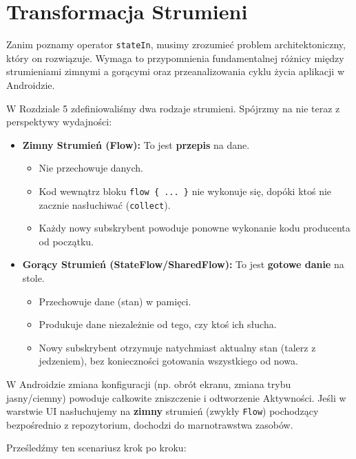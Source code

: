 \section{Transformacja Strumieni}

Zanim poznamy operator \texttt{stateIn}, musimy zrozumieć problem architektoniczny, który on rozwiązuje. Wymaga to przypomnienia fundamentalnej różnicy między strumieniami zimnymi a gorącymi oraz przeanalizowania cyklu życia aplikacji w Androidzie.

W Rozdziale 5 zdefiniowaliśmy dwa rodzaje strumieni. Spójrzmy na nie teraz z perspektywy wydajności:

\begin{itemize}
    \item \textbf{Zimny Strumień (Flow):} To jest \textbf{przepis} na dane.
    \begin{itemize}
        \item Nie przechowuje danych.
        \item Kod wewnątrz bloku \texttt{flow \{ ... \}} nie wykonuje się, dopóki ktoś nie zacznie nasłuchiwać (\texttt{collect}).
        \item Każdy nowy subskrybent powoduje ponowne wykonanie kodu producenta od początku.
    \end{itemize}
    
    \item \textbf{Gorący Strumień (StateFlow/SharedFlow):} To jest \textbf{gotowe danie} na stole.
    \begin{itemize}
        \item Przechowuje dane (stan) w pamięci.
        \item Produkuje dane niezależnie od tego, czy ktoś ich słucha.
        \item Nowy subskrybent otrzymuje natychmiast aktualny stan (talerz z jedzeniem), bez konieczności gotowania wszystkiego od nowa.
    \end{itemize}
\end{itemize}

W Androidzie zmiana konfiguracji (np. obrót ekranu, zmiana trybu jasny/ciemny) powoduje całkowite zniszczenie i odtworzenie Aktywności. Jeśli w warstwie UI nasłuchujemy na \textbf{zimny} strumień (zwykły \texttt{Flow}) pochodzący bezpośrednio z repozytorium, dochodzi do marnotrawstwa zasobów.

Prześledźmy ten scenariusz krok po kroku:

